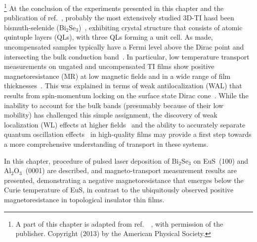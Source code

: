\footnote[2]{A part of this chapter is adapted from ref.~\cite{bilayer2014}~, with permission of the publisher. Copyright (2013) by the American Physical Society.}%
%
At the conclusion of the experiments presented in this chapter and the publication of ref.~\cite{bilayer2014}, probably the most extensively studied 3D-TI hasd been bismuth-selenide (Bi$_2$Se$_3$)~\cite{TI_electronic_structure_zhang, Zhanybek3, TI_other1}, exhibiting crystal structure that consists of atomic quintuple layers (QLs), with three QLs forming a unit cell. As made, uncompensated samples typically have a Fermi level above the Dirac point and intersecting the bulk conduction band~\cite{TI_ARPES1, ARPES_thickness}. In particular, low temperature transport measurements on ungated and uncompensated TI films show positive magnetoresistance (MR) at low magnetic fields and in a wide range of film thicknesses~\cite{ TI_WAL_Hongkong, TI_WAL_thickness, zhangli2012}. This was explained in terms of weak antilocalization (WAL) that results from spin-momentum locking on the surface state Dirac cone~\cite{TI_WAL_Hongkong, WL_theory}. While the inability to account for the bulk bands (presumably because of their low mobility) has challenged this simple assignment, the discovery of weak localization (WL) effects at higher fields~\cite{zhangli2013} and the ability to accurately separate quantum oscillation effects~\cite{Ando_PRL} in high-quality films may provide a first step towards a more comprehensive understanding of transport in these systems.

In this chapter, procedure of pulsed laser deposition of Bi$_2$Se$_3$ on EuS~(100) and Al$_2$O$_3$~(0001) are described, and magneto-transport measurement results are presented, demonstrating a negative magnetoresistance that emerges below the Curie temperature of EuS, in contrast to the ubiquitously observed positive magnetoresistance in topological insulator thin films.


